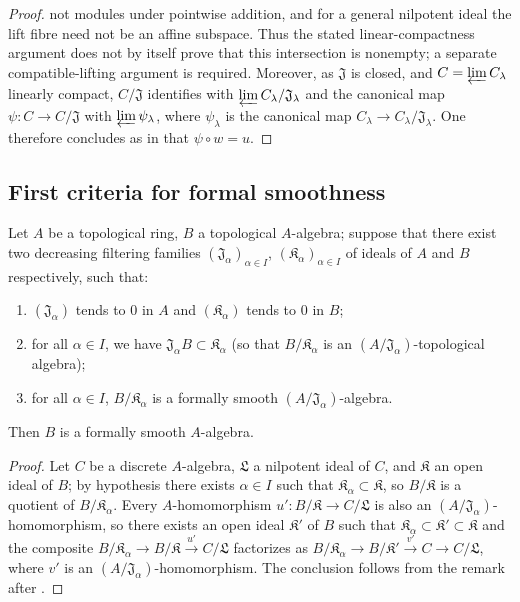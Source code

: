 \begin{proof}
{not modules under pointwise addition, and for a general nilpotent ideal the
lift fibre need not be an affine subspace. Thus the stated linear-compactness
argument does not by itself prove that this intersection is nonempty; a
separate compatible-lifting argument is required.}
Moreover, as $\mathfrak{J}$ is closed, and $C=\varprojlim C_\lambda$
linearly compact, $C/\mathfrak{J}$ identifies with
$\varprojlim C_\lambda/\mathfrak{J}_\lambda$ and the canonical map
$\psi:C\to C/\mathfrak{J}$ with $\varprojlim\psi_\lambda$, where
$\psi_\lambda$ is the canonical map
$C_\lambda\to C_\lambda/\mathfrak{J}_\lambda$. One therefore concludes as in
 that $\psi\circ w=u$.
\end{proof}

\subsection{First criteria for formal smoothness}
\label{subsection:0.19.4}

\begin{proposition}[19.4.1]
\label{0.19.4.1}
Let $A$ be a topological ring, $B$ a topological $A$-algebra;
suppose that there exist two decreasing filtering families $(\mathfrak{J}_\alpha)_{\alpha\in I}$, $(\mathfrak K_\alpha)_{\alpha\in I}$ of ideals of $A$ and $B$ respectively, such that:
\begin{enumerate}
  \item[$1^\circ$] $(\mathfrak{J}_\alpha)$ tends to $0$ in $A$ and $(\mathfrak K_\alpha)$ tends to $0$ in $B$;
  \item[$2^\circ$] for all $\alpha\in I$, we have $\mathfrak{J}_\alpha B\subset\mathfrak K_\alpha$ (so that $B/\mathfrak K_\alpha$ is an $(A/\mathfrak{J}_\alpha)$-topological algebra);
  \item[$3^\circ$] for all $\alpha\in I$, $B/\mathfrak K_\alpha$ is a formally smooth $(A/\mathfrak{J}_\alpha)$-algebra.
\end{enumerate}
Then $B$ is a formally smooth $A$-algebra.
\end{proposition}

\begin{proof}
Let $C$ be a discrete $A$-algebra, $\mathfrak{L}$ a nilpotent ideal of $C$, and $\mathfrak K$ an open ideal of $B$;
by hypothesis there exists $\alpha\in I$ such that $\mathfrak K_\alpha\subset\mathfrak K$, so $B/\mathfrak K$ is a quotient of $B/\mathfrak K_\alpha$.
Every $A$-homomorphism $u':B/\mathfrak K\to C/\mathfrak{L}$ is also an
$(A/\mathfrak{J}_\alpha)$-homomorphism, so there exists an open ideal
$\mathfrak K'$ of $B$ such that
$\mathfrak K_\alpha\subset\mathfrak K'\subset\mathfrak K$ and the composite
$B/\mathfrak K_\alpha\to B/\mathfrak K\xrightarrow{u'}C/\mathfrak{L}$
factorizes as
$B/\mathfrak K_\alpha\to B/\mathfrak K'\xrightarrow{v'}C\to C/\mathfrak{L}$, where $v'$ is an
$(A/\mathfrak{J}_\alpha)$-homomorphism. The conclusion
follows from the remark after .
\end{proof}

